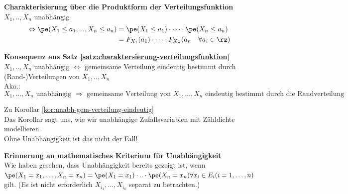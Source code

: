 
\begin{satz}
    \label{satz:charaktersierung-verteilungsfunktion}
    \textbf{Charakterisierung über die Produktform der Verteilungsfunktion}  \\
    $X_1, .., X_n$ unabhängig
    \begin{align*}
        \Leftrightarrow \pe ( X_1 \leq a_1 , ..., X_n \leq a_n ) & = \pe(X_1 \leq a_1) \cdot \dots \cdot
        \pe(X_n \leq a_n) \\
        & =  F_{X_1}(a_1) \cdot \dots \cdot F_{X_n}(a_n \quad \forall a_i \in \rz)
    \end{align*}
\end{satz}

\begin{kor}
    \label{kor:unabh-gem-verteilung-eindeutig}
    \textbf{Konsequenz aus Satz \ref{satz:charaktersierung-verteilungsfunktion}}  \\
    $X_1, .., X_n$ unabhängig $\Leftrightarrow$ gemeinsame Verteilung eindeutig bestimmt durch (Rand-)Verteilungen von
    $X_1, .., X_n$ \\
    Aka.:
    \[
        X_1, \dots, X_n  \text{ unabhängig } \Rightarrow \text{ gemeinsame Verteilung von } X_1, \dots, X_n \text{ eindeutig bestimmt durch die Randverteilung}
    \]
\end{kor}

\begin{bem}
    Zu Korollar \autoref{kor:unabh-gem-verteilung-eindeutig}   \\
    Das Korollar sagt uns, wie wir unabhängige Zufallsvariablen mit Zähldichte modellieren. \\
    Ohne Unabhängigkeit ist das nicht der Fall!
\end{bem}

\begin{bem}
    \textbf{Erinnerung an mathematisches Kriterium für Unabhängigkeit}   \\
    Wie haben gesehen, dass Unabhängigkeit bereits gezeigt ist, wenn
    $\pe(X_1 = x_1, \dots, X_n = x_n) = \pe(X_1 = x_1) \cdot .. \cdot \pe(X_n = x_n) \forall x_i \in E_i (i = 1, \dots, n)$ gilt.
    (Es ist nicht erforderlich $X_{i_1}, \dots, X_{i_k}$ separat zu betrachten.)
\end{bem}

